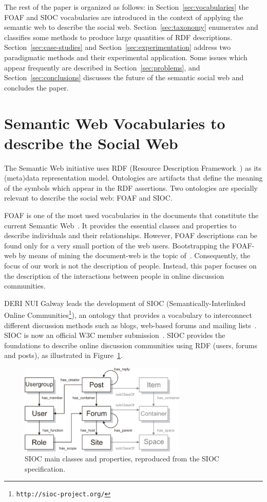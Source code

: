 \documentclass{../templates/www2008-submission}
\begin{document}
The rest of the paper is organized as follows: in Section~\ref{sec:vocabularies}
the FOAF and SIOC vocabularies are introduced in the context of applying
the semantic web to describe the social web. Section~\ref{sec:taxonomy}
enumerates and classifies some methods to produce large quantities
of RDF descriptions. Section~\ref{sec:case-studies} and
Section~\ref{sec:experimentation} address two paradigmatic methods
and their experimental application. Some issues which appear
frequently are described in Section~\ref{sec:problems}, and
Section~\ref{sec:conclusions} discusses the future of the
semantic social web and concludes the paper.


\section{\label{sec:vocabularies}Semantic Web Vocabularies to describe the Social Web}

The Semantic Web initiative uses RDF (Resource Description
Framework~\cite{RDF}) as its (meta)data representation model.
Ontologies are artifacts that define the meaning of the symbols
which appear in the RDF assertions. Two ontologies are
specially relevant to describe the social web: FOAF and SIOC.

FOAF is one of the most used vocabularies in the documents that
constitute the current Semantic Web~\cite{Ding2005, Finin2005}.
It provides the essential classes and properties to describe individuals
and their relationships. However, FOAF descriptions can be found
only for a very small portion of the web users. Bootstrapping the
FOAF-web by means of mining the document-web is the topic
of~\cite{Mika2004}. Consequently, the focus of our work is not the
description of people. Instead, this paper focuses on the description
of the interactions between people in online discussion communities.

DERI NUI Galway leads the development of SIOC (Seman\-ti\-cally-Interlinked Online
Communities\footnote{\texttt{http://sioc-project.org/}}), an ontology that 
provides a vocabulary to interconnect different discussion methods such 
as blogs, web-based forums and mailing lists~\cite{Breslin2006,Breslin2005}.
SIOC is now an official W3C member submission~\cite{Bojars2007}.
SIOC provides the foundations to describe online discussion
communities using RDF (users, forums and posts), as illustrated in
Figure~\ref{fig:sioc}.

\begin{figure}
 \centering
 \includegraphics[width=8cm]{images/sioc.png}
 \caption{\label{fig:sioc}SIOC main classes and properties, reproduced from the SIOC specification.}
\end{figure}
\end{document}
